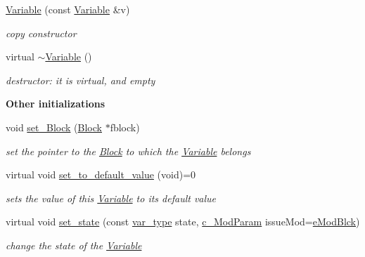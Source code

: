 \begin{Indent}
\begin{DoxyCompactItemize}
\mbox{\hyperlink{class_s_m_spp__di__unipi__it_1_1_variable_af77975bb11838f0c93a91c030a0babcd}{Variable}} (const \mbox{\hyperlink{class_s_m_spp__di__unipi__it_1_1_variable}{Variable}} \&v)
\begin{DoxyCompactList}\small\item\em copy constructor \end{DoxyCompactList}\item 
virtual \mbox{\hyperlink{class_s_m_spp__di__unipi__it_1_1_variable_a4319c110ceb0a5838046fa12e0720d31}{$\sim$\+Variable}} ()
\begin{DoxyCompactList}\small\item\em destructor\+: it is virtual, and empty \end{DoxyCompactList}\end{DoxyCompactItemize}
\end{Indent}
\begin{Indent}\textbf{ Other initializations}\par
\begin{DoxyCompactItemize}
\item 
void \mbox{\hyperlink{class_s_m_spp__di__unipi__it_1_1_variable_ae25adfb4d0355dc999de19a850b0025d}{set\+\_\+\+Block}} (\mbox{\hyperlink{class_s_m_spp__di__unipi__it_1_1_block}{Block}} $\ast$fblock)
\begin{DoxyCompactList}\small\item\em set the pointer to the \mbox{\hyperlink{class_s_m_spp__di__unipi__it_1_1_block}{Block}} to which the \mbox{\hyperlink{class_s_m_spp__di__unipi__it_1_1_variable}{Variable}} belongs \end{DoxyCompactList}\item 
virtual void \mbox{\hyperlink{class_s_m_spp__di__unipi__it_1_1_variable_af5d1aa1e79219b323968cf33d689f474}{set\+\_\+to\+\_\+default\+\_\+value}} (void)=0
\begin{DoxyCompactList}\small\item\em sets the value of this \mbox{\hyperlink{class_s_m_spp__di__unipi__it_1_1_variable}{Variable}} to its default value \end{DoxyCompactList}\item 
virtual void \mbox{\hyperlink{class_s_m_spp__di__unipi__it_1_1_variable_a2520cb209ab7d71c22789de6e94f0487}{set\+\_\+state}} (const \mbox{\hyperlink{class_s_m_spp__di__unipi__it_1_1_variable_a32378add5594ab0f1fb45e711d88924d}{var\+\_\+type}} state, \mbox{\hyperlink{group___modification___t_y_p_e_s_ga544246d8c462e9a2d817c2c30797968f}{c\+\_\+\+Mod\+Param}} issue\+Mod=\mbox{\hyperlink{group___modification___t_y_p_e_s_gga48fddcdd03a03f49b7e389ca1ed938d4a21b14b26b1c0093a0905f6fc010bad29}{e\+Mod\+Blck}})
\begin{DoxyCompactList}\small\item\em change the state of the \mbox{\hyperlink{class_s_m_spp__di__unipi__it_1_1_variable}{Variable}} \end{DoxyCompactList}\end{DoxyCompactItemize}
\end{Indent}
